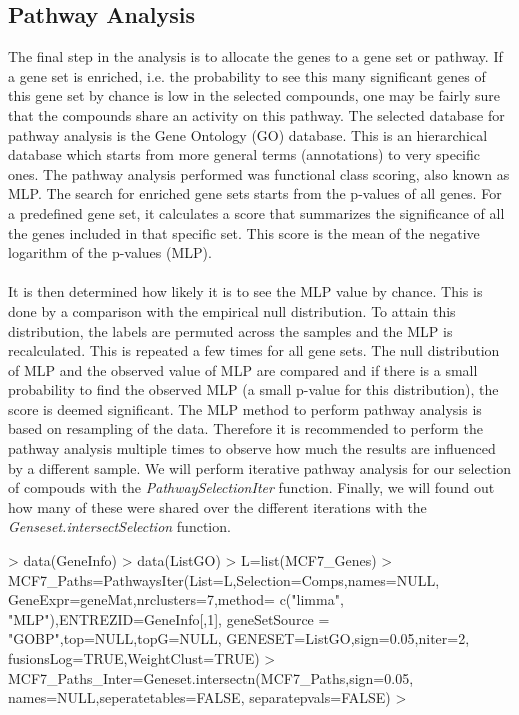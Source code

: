 \documentclass[a4paper]{article}
\begin{document}
\subsection{Pathway Analysis}
The final step in the analysis is to allocate the genes to a gene set or
pathway. If a gene set is enriched, i.e. the probability to see this many
significant genes of this gene set by chance is low in the selected compounds,
one may be fairly sure that the compounds share an activity on this pathway.
The selected database for pathway analysis is the Gene Ontology (GO) database.
This is an hierarchical database which starts from more general terms
(annotations) to very specific ones. The pathway analysis performed was
functional class scoring, also known as MLP. The search for enriched gene sets
starts from the p-values of all genes. For a predefined gene set, it calculates
a score that summarizes the significance of all the genes included in that
specific set. This score is the mean of the negative logarithm of the p-values
(MLP).\\ \\
It is then determined how likely it is to see the MLP value by chance. This is
done by a comparison with the empirical null distribution. To attain this
distribution, the labels are permuted across the samples and the MLP is
recalculated. This is repeated a few times for all gene sets. The null
distribution of MLP and the observed value of MLP are compared and if there is a
small probability to find the observed MLP (a small p-value for this
distribution), the score is deemed significant. The MLP method to perform
pathway analysis is based on resampling of the data. Therefore it is recommended
to perform the pathway analysis multiple times to observe how much the results
are influenced by a different sample. We will perform iterative pathway analysis
for our selection of compouds with the {\it PathwaySelectionIter} function.
Finally, we will found out how many of these were shared over the different
iterations with the {\it Genseset.intersectSelection} function.
\begin{Schunk}
\begin{Sinput}
> data(GeneInfo)
> data(ListGO)
> L=list(MCF7_Genes)
> MCF7_Paths=PathwaysIter(List=L,Selection=Comps,names=NULL,
                         GeneExpr=geneMat,nrclusters=7,method=
                         c("limma", "MLP"),ENTREZID=GeneInfo[,1],
                         geneSetSource = "GOBP",top=NULL,topG=NULL,
                         GENESET=ListGO,sign=0.05,niter=2,
                         fusionsLog=TRUE,WeightClust=TRUE)
> MCF7_Paths_Inter=Geneset.intersectn(MCF7_Paths,sign=0.05,
                                     names=NULL,seperatetables=FALSE,
                                     separatepvals=FALSE)
> 
\end{Sinput}
\end{Schunk}
\newpage
\end{document}

